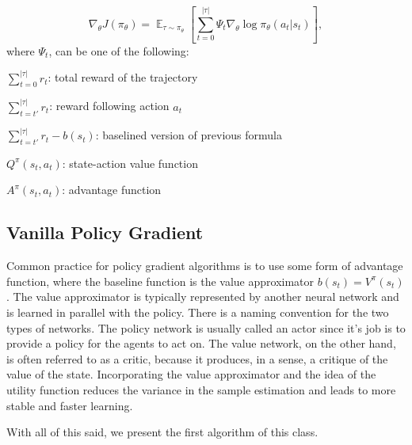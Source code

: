 \[
  \nabla_\theta J(\pi_\theta) = \mathop{\mathbb{E}}_{\tau \sim \pi_\theta}\left[\sum_{t=0}^{|\tau|} \Psi_t \nabla_\theta \log \pi_\theta(a_t|s_t)\right],
\]
where $\Psi_t$, can be one of the following:
\begin{list}{}{}
  \item $\sum_{t=0}^{|\tau|} r_t$: total reward of the trajectory
  \item $\sum_{t=t'}^{|\tau|} r_t$: reward following action $a_t$
  \item $\sum_{t=t'}^{|\tau|} r_t - b(s_t)$: baselined version of previous formula
  \item $Q^\pi(s_t,a_t)$: state-action value function
  \item $A^\pi(s_t,a_t)$: advantage function
\end{list}

\subsection{Vanilla Policy Gradient}
Common practice for policy gradient algorithms is to use some form of advantage function, where the baseline function is the value approximator $b(s_t) = V^\pi(s_t)$.
The value approximator is typically represented by another neural network and is learned in parallel with the policy.
There is a naming convention for the two types of networks.
The policy network is usually called an actor since it's job is to provide a policy for the agents to act on.
The value network, on the other hand, is often referred to as a critic, because it produces, in a sense, a critique of the value of the state.
Incorporating the value approximator and the idea of the utility function reduces the variance in the sample estimation and leads to more stable and faster learning.

With all of this said, we present the first algorithm of this class.


